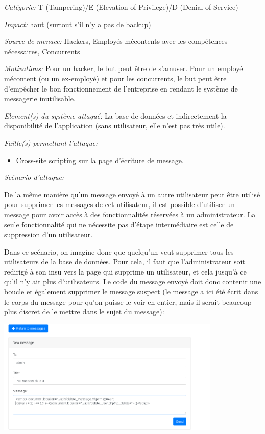 \documentclass{article}
\begin{document}
\textit{Catégorie:} T (Tampering)/E (Elevation of Privilege)/D (Denial
of Service)

\textit{Impact:} haut (surtout s'il n'y a pas de backup)

\textit{Source de menace:} Hackers, Employés mécontents avec les
compétences nécessaires, Concurrents

\textit{Motivations:} Pour un hacker, le but peut être de s'amuser. Pour un employé mécontent (ou un ex-employé) et pour les concurrents,
  le but peut être d'empêcher le bon fonctionnement de l'entreprise en
  rendant le système de messagerie inutilisable.

\textit{Element(s) du système attaqué:} La base de données et
indirectement la disponibilité de l'application (sans utilisateur, elle
n'est pas très utile).

\textit{Faille(s) permettant l'attaque:}

\begin{itemize}

\item
  Cross-site scripting sur la page d'écriture de message.
\end{itemize}

\textit{Scénario d'attaque:}

De la même manière qu'un message envoyé à un autre utilisateur peut être
utilisé pour supprimer les messages de cet utilisateur, il est possible
d'utiliser un message pour avoir accès à des fonctionnalités réservées à
un administrateur. La seule fonctionnalité qui ne nécessite pas d'étape intermédiaire
est celle de suppression d'un utilisateur.

Dans ce scénario, on imagine donc que quelqu'un veut supprimer tous les
utilisateurs de la base de données. Pour cela, il faut que
l'administrateur soit redirigé à son insu vers la page qui supprime un
utilisateur, et cela jusqu'à ce qu'il n'y ait plus d'utilisateurs. Le
code du message envoyé doit donc contenir une boucle et également
supprimer le message suspect (le message a ici été écrit dans le corps
du message pour qu'on puisse le voir en entier, mais il serait beaucoup
plus discret de le mettre dans le sujet du message):\\

\begin{center}\includegraphics[width=0.8\textwidth]{images/users1.PNG}\end{center}\\
\end{document}
